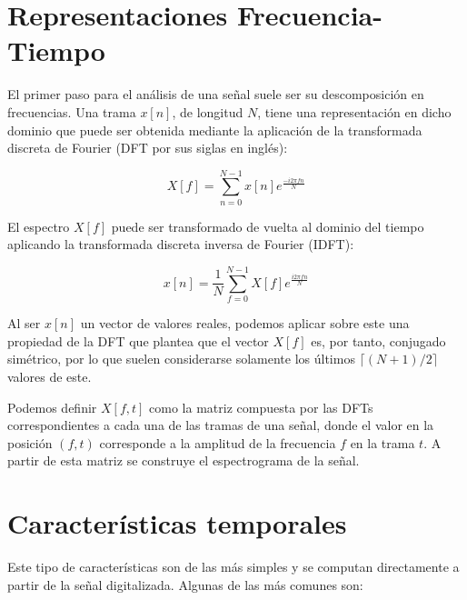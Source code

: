 \section{Representaciones Frecuencia-Tiempo}\label{sec:representacionesFrecuencia-tiempo}

El primer paso para el análisis de una señal suele ser su descomposición en frecuencias.
Una trama $x[n]$, de longitud $N$, tiene una representación en dicho dominio que puede ser obtenida mediante la aplicación de la transformada discreta de Fourier (DFT por sus siglas en inglés):

\begin{equation}
    \label{eq:DFT}
    X[f] = \sum_{n=0}^{N-1}{x[n]e^{\frac{-i2\pi fn}{N}}}
\end{equation}

El espectro $X[f]$ puede ser transformado de vuelta al dominio del tiempo aplicando la transformada discreta inversa de Fourier (IDFT):

\begin{equation}
    \label{eq:IDFT}
    x[n] = \frac{1}{N}\sum_{f=0}^{N-1}{X[f]e^{\frac{i2\pi fn}{N}}}
\end{equation}

Al ser $x[n]$ un vector de valores reales, podemos aplicar sobre este una propiedad de la DFT que plantea que el vector $X[f]$ es, por tanto, conjugado simétrico, por lo que suelen considerarse solamente los últimos $\lceil (N+1)/2 \rceil$ valores de este.

Podemos definir $X[f,t]$ como la matriz compuesta por las DFTs correspondientes a cada una de las tramas de una señal, donde el valor en la posición $(f, t)$ corresponde a la amplitud de la frecuencia $f$ en la trama $t$.
A partir de esta matriz se construye el espectrograma de la señal.

\section{Características temporales}\label{sec:característicasTemporales}

Este tipo de características son de las más simples y se computan directamente a partir de la señal digitalizada.
Algunas de las más comunes son:

